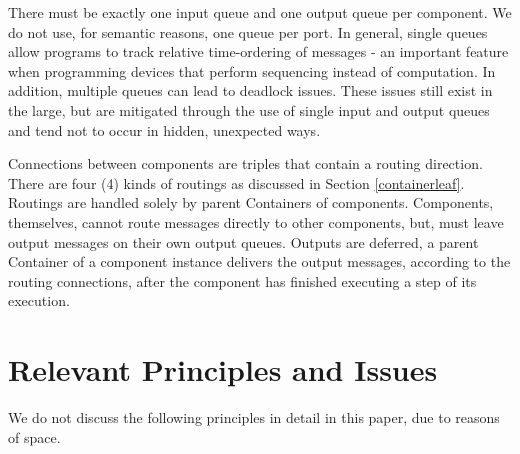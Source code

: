 \documentclass[10pt,anonymous,review]{acmart}
\begin{document}
There must be exactly one input queue and one output queue per component. We
do not use, for semantic reasons, one queue per port. In general, single
queues allow programs to track relative time-ordering of messages - an
important feature when programming devices that perform sequencing
instead of computation. In addition, multiple queues can lead to
deadlock issues. These issues still exist in the large, but are
mitigated through the use of single input and output queues and tend not
to occur in hidden, unexpected ways.

Connections between components are triples that contain a routing direction.
There are four (4) kinds of routings as discussed in Section \ref{containerleaf}.
Routings are handled solely by parent Containers of components. Components, themselves, cannot route messages directly to other components, but, must leave output messages on their own output queues. Outputs are deferred, a parent Container of a component instance delivers the output messages, according to the routing connections, after the component has finished executing a step of its execution.


\section{Relevant Principles and Issues}
We do not discuss the following principles in detail in this paper, due
to reasons of space.
\end{document}
